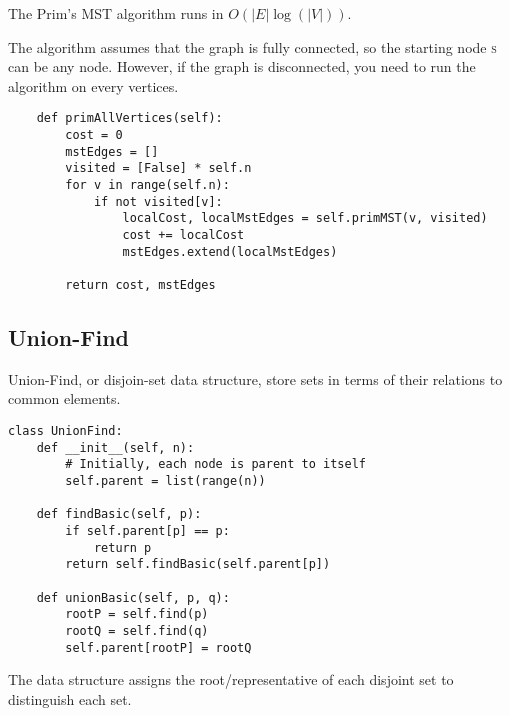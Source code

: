 \noindent The Prim's MST algorithm runs in $O(|E| \log (|V|))$.

\noindent The algorithm assumes that the graph is fully connected, so the starting node \textsc{s} can be any node.
However, if the graph is disconnected, you need to run the algorithm on every vertices.

\begin{verbatim}
    def primAllVertices(self):
        cost = 0
        mstEdges = []
        visited = [False] * self.n
        for v in range(self.n):
            if not visited[v]:
                localCost, localMstEdges = self.primMST(v, visited)
                cost += localCost
                mstEdges.extend(localMstEdges)

        return cost, mstEdges
\end{verbatim}

\subsection{Union-Find}

Union-Find, or disjoin-set data structure, store sets in terms of their relations to common elements.

\begin{verbatim}
class UnionFind:
    def __init__(self, n):
        # Initially, each node is parent to itself
        self.parent = list(range(n))

    def findBasic(self, p):
        if self.parent[p] == p:
            return p
        return self.findBasic(self.parent[p])

    def unionBasic(self, p, q):
        rootP = self.find(p)
        rootQ = self.find(q)
        self.parent[rootP] = rootQ
\end{verbatim}

\noindent The data structure assigns the root/representative of each disjoint set to distinguish each set.

